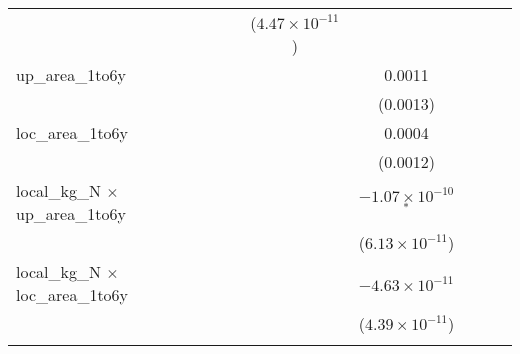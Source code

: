 \begin{tabular}{lcccccccc}
                                               &                               &                               &                               & ($4.47\times 10^{-11}$)       &                               &                               &                               &   \\   
   up\_area\_1to6y                             &                               &                               &                               &                               & 0.0011                        &                               &                               &   \\   
                                               &                               &                               &                               &                               & (0.0013)                      &                               &                               &   \\   
   loc\_area\_1to6y                            &                               &                               &                               &                               & 0.0004                        &                               &                               &   \\   
                                               &                               &                               &                               &                               & (0.0012)                      &                               &                               &   \\   
   local\_kg\_N $\times$ up\_area\_1to6y       &                               &                               &                               &                               & $-1.07\times 10^{-10}$$^{*}$  &                               &                               &   \\   
                                               &                               &                               &                               &                               & ($6.13\times 10^{-11}$)       &                               &                               &   \\   
   local\_kg\_N $\times$ loc\_area\_1to6y      &                               &                               &                               &                               & $-4.63\times 10^{-11}$        &                               &                               &   \\   
                                               &                               &                               &                               &                               & ($4.39\times 10^{-11}$)       &                               &                               &   \\   
$$
\end{tabular}
